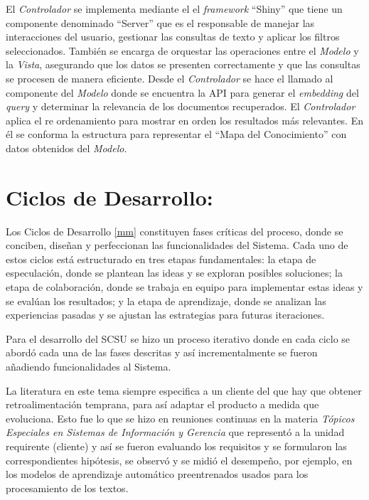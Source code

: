 \documentclass[
  12pt,
  openany]{book}
\begin{document}
El \emph{Controlador} se implementa mediante el el \emph{framework} ``Shiny'' que tiene un componente denominado ``Server'' que es el responsable de manejar las interacciones del usuario, gestionar las consultas de texto y aplicar los filtros seleccionados. También se encarga de orquestar las operaciones entre el \emph{Modelo} y la \emph{Vista}, asegurando que los datos se presenten correctamente y que las consultas se procesen de manera eficiente. Desde el \emph{Controlador} se hace el llamado al componente del \emph{Modelo} donde se encuentra la API para generar el \emph{embedding} del \emph{query} y determinar la relevancia de los documentos recuperados. El \emph{Controlador} aplica el re ordenamiento para mostrar en orden los resultados más relevantes. En él se conforma la estructura para representar el ``Mapa del Conocimiento'' con datos obtenidos del \emph{Modelo}.

\hypertarget{desarrollociclos}{%
\section{Ciclos de Desarrollo:}\label{desarrollociclos}}

Los Ciclos de Desarrollo \ref{mm} constituyen fases críticas del proceso, donde se conciben, diseñan y perfeccionan las funcionalidades del Sistema. Cada uno de estos ciclos está estructurado en tres etapas fundamentales: la etapa de especulación, donde se plantean las ideas y se exploran posibles soluciones; la etapa de colaboración, donde se trabaja en equipo para implementar estas ideas y se evalúan los resultados; y la etapa de aprendizaje, donde se analizan las experiencias pasadas y se ajustan las estrategias para futuras iteraciones.

Para el desarrollo del SCSU se hizo un proceso iterativo donde en cada ciclo se abordó cada una de las fases descritas y así incrementalmente se fueron añadiendo funcionalidades al Sistema.

La literatura en este tema siempre especifica a un cliente del que hay que obtener retroalimentación temprana, para así adaptar el producto a medida que evoluciona. Esto fue lo que se hizo en reuniones continuas en la materia \emph{Tópicos Especiales en Sistemas de Información y Gerencia} que representó a la unidad requirente (cliente) y así se fueron evaluando los requisitos y se formularon las correspondientes hipótesis, se observó y se midió el desempeño, por ejemplo, en los modelos de aprendizaje automático preentrenados usados para los procesamiento de los textos.
\end{document}
